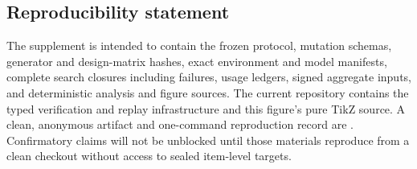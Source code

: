 \subsection*{Reproducibility statement}

The supplement is intended to contain the frozen protocol, mutation schemas,
generator and design-matrix hashes, exact environment and model manifests,
complete search closures including failures, usage ledgers, signed aggregate
inputs, and deterministic analysis and figure sources.  The current repository
contains the typed verification and replay infrastructure and this figure's
pure TikZ source.  A clean, anonymous artifact and one-command reproduction
record are .
Confirmatory claims will not be unblocked until those materials reproduce from
a clean checkout without access to sealed item-level targets.
